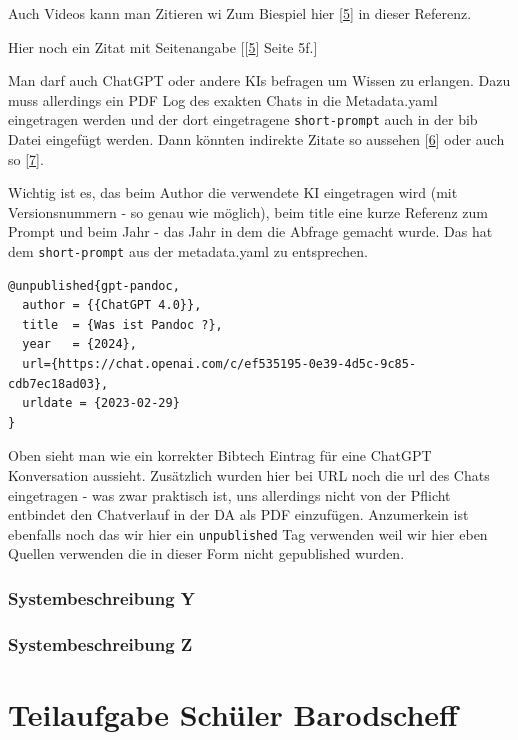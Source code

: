 \documentclass[
    headings=optiontotocandhead,%
    twoside,
    numbers=noenddot,%
    12pt, %
    titlepage, %
    parskip=full, %
    listof=leveldown, 
    numbers=noenddot, %
    a4paper,DIV=14,
    BCOR=15mm,
]{scrbook}
\makeatletter
\newcommand{\passthrough}[1]{#1}
\newcommand*{\the@orig@section}{}
\let\the@orig@section\section
\renewcommand*{\section}{%
  \clearpage
  \the@orig@section
}
\makeatother
\begin{document}
Auch Videos kann man Zitieren wi Zum Biespiel hier
{[}\protect\hyperlink{ref-Zatko15}{5}{]} in dieser Referenz.

Hier noch ein Zitat mit Seitenangabe
{[}{[}\protect\hyperlink{ref-Zatko15}{5}{]} Seite 5f.{]}

Man darf auch ChatGPT oder andere KIs befragen um Wissen zu erlangen.
Dazu muss allerdings ein PDF Log des exakten Chats in die Metadata.yaml
eingetragen werden und der dort eingetragene
\passthrough{\lstinline!short-prompt!} auch in der bib Datei eingefügt
werden. Dann könnten indirekte Zitate so aussehen
{[}\protect\hyperlink{ref-gpt-pandoc}{6}{]} oder auch so
{[}\protect\hyperlink{ref-gpt-atomaufbau}{7}{]}.

Wichtig ist es, das beim Author die verwendete KI eingetragen wird (mit
Versionsnummern - so genau wie möglich), beim title eine kurze Referenz
zum Prompt und beim Jahr - das Jahr in dem die Abfrage gemacht wurde.
Das hat dem \passthrough{\lstinline!short-prompt!} aus der metadata.yaml
zu entsprechen.

\begin{lstlisting}
@unpublished{gpt-pandoc,
  author = {{ChatGPT 4.0}},
  title  = {Was ist Pandoc ?},
  year   = {2024},
  url={https://chat.openai.com/c/ef535195-0e39-4d5c-9c85-cdb7ec18ad03},
  urldate = {2023-02-29}
}
\end{lstlisting}

Oben sieht man wie ein korrekter Bibtech Eintrag für eine ChatGPT
Konversation aussieht. Zusätzlich wurden hier bei URL noch die url des
Chats eingetragen - was zwar praktisch ist, uns allerdings nicht von der
Pflicht entbindet den Chatverlauf in der DA als PDF einzufügen.
Anzumerkein ist ebenfalls noch das wir hier ein
\passthrough{\lstinline!unpublished!} Tag verwenden weil wir hier eben
Quellen verwenden die in dieser Form nicht gepublished wurden.

\hypertarget{systembeschreibung-y}{%
\subsubsection{Systembeschreibung Y}\label{systembeschreibung-y}}

\hypertarget{systembeschreibung-z}{%
\subsubsection{Systembeschreibung Z}\label{systembeschreibung-z}}

\hypertarget{teilaufgabe-schuxfcler-barodscheff}{%
\section{Teilaufgabe Schüler
Barodscheff}\label{teilaufgabe-schuxfcler-barodscheff}}
\end{document}
